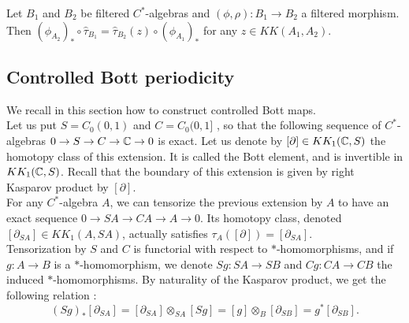 \begin{prop}
Let $B_1$ and $B_2$ be filtered $C^*$-algebras and $(\phi,\rho) :B_1\rightarrow B_2 $ a filtered morphism. Then $ (\phi_{A_2})_*\circ \hat \tau_{B_1}=\hat \tau_{B_2}(z)\circ(\phi_{A_1})_* $ for any $z\in KK(A_1,A_2)$.
\end{prop}

\subsection{Controlled Bott periodicity}

We recall in this section how to construct controlled Bott maps.\\

Let us put $S = C_0(0,1)$ and $C= C_0(0,1]$ , so that the following sequence of $C^*$-algebras $0\rightarrow S \rightarrow C \rightarrow \mathbb C \rightarrow  0 $ is exact. Let us denote by $[\partial]\in KK_1(\mathbb C,S)$ the homotopy class of this extension. It is called the Bott element, and is invertible in $KK_1(\mathbb C,S)$. Recall that the boundary of this extension is given by right Kasparov product by $[\partial]$.\\ 

For any $C^*$-algebra $A$, we can tensorize the previous extension by $A$ to have an exact sequence $0\rightarrow SA \rightarrow CA \rightarrow A \rightarrow  0 $. Its homotopy class, denoted $[\partial_{SA}]\in KK_1(A,SA)$, actually satisfies $\tau_A([\partial ]) =[\partial_{SA}]$.\\

Tensorization by $S$ and $C$ is functorial with respect to $*$-homomorphisms, and if $g : A\rightarrow B$ is a $*$-homomorphism, we denote $Sg : SA\rightarrow SB$ and $Cg : CA\rightarrow CB$ the induced $*$-homomorphisms. By naturality of the Kasparov product, we get the following relation :
\[(Sg)_*[\partial_{SA}] = [\partial_{SA}]\otimes_{SA} [Sg] = [g]\otimes_{B} [\partial_{SB}] = g^*[\partial_{SB}] .\]












